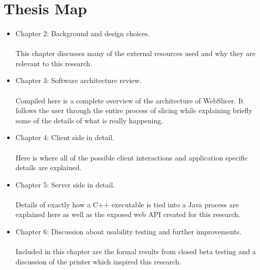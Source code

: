 \section{Thesis Map}
\paragraph{}
\begin{itemize}
\item Chapter 2: Background and design choices.
	\paragraph{}
	This chapter discusses many of the external resources used and why they are relevant to this research.
\item Chapter 3: Software architecture review.
	\paragraph{}
	Compiled here is a complete overview of the architecture of WebSlicer. It follows the user through the entire process of slicing while explaining briefly some of the details of what is really happening.
\item Chapter 4: Client side in detail. 
	\paragraph{}
	Here is where all of the possible client interactions and application specific details are explained.
\item Chapter 5: Server side in detail.
	\paragraph{}
	Details of exactly how a C++ executable is tied into a Java process are explained here as well as the exposed web API created for this research.
\item Chapter 6: Discussion about usability testing and further improvements.
	\paragraph{}
	Included in this chapter are the formal results from closed beta testing and a discussion of the printer which inspired this research.
\end{itemize}

